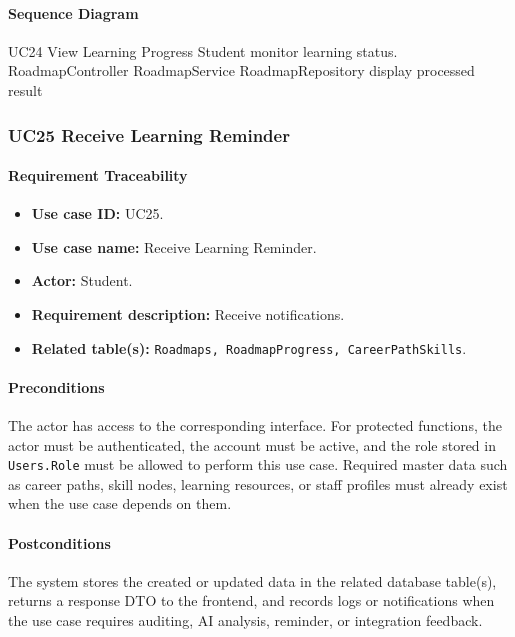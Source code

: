 \paragraph{Sequence Diagram}

\SequenceDiagram
{UC24 View Learning Progress}
{Student}
{monitor learning status.}
{RoadmapController}
{RoadmapService}
{RoadmapRepository}
{display processed result}

\subsubsection{UC25 Receive Learning Reminder}

\paragraph{Requirement Traceability}

\begin{itemize}
    \item \textbf{Use case ID:} UC25.
    \item \textbf{Use case name:} Receive Learning Reminder.
    \item \textbf{Actor:} Student.
    \item \textbf{Requirement description:} Receive notifications.
    \item \textbf{Related table(s):} \texttt{Roadmaps, RoadmapProgress, CareerPathSkills}.
\end{itemize}

\paragraph{Preconditions}

The actor has access to the corresponding interface. For protected functions, the actor must be authenticated, the account must be active, and the role stored in \texttt{Users.Role} must be allowed to perform this use case. Required master data such as career paths, skill nodes, learning resources, or staff profiles must already exist when the use case depends on them.

\paragraph{Postconditions}

The system stores the created or updated data in the related database table(s), returns a response DTO to the frontend, and records logs or notifications when the use case requires auditing, AI analysis, reminder, or integration feedback.

